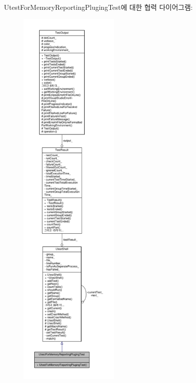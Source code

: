Utest\+For\+Memory\+Reporting\+Pluging\+Test에 대한 협력 다이어그램\+:
\nopagebreak
\begin{figure}[H]
\begin{center}
\leavevmode
\includegraphics[height=550pt]{class_utest_for_memory_reporting_pluging_test__coll__graph}
\end{center}
\end{figure}
